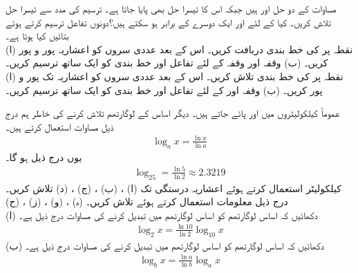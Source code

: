 مساوات  کے دو حل  اور   ہیں جبکہ اس کا تیسرا حل بھی پایا جاتا ہے۔ ترسیم کی مدد سے تیسرا حل تلاش کریں۔
کیا  کے لئے   اور  ایک دوسرے کے برابر ہو سکتے ہیں؟دونوں تفاعل ترسیم کرتے ہوئے بتائیں کیا ہوتا ہے۔
\\
(ا) نقطہ  پر  کی خط بندی دریافت کریں۔ اس کے بعد عددی سروں کو  اعشاریہ  پور و پور کریں۔ (ب) وقفہ  اور وقفہ  کے لئے تفاعل اور خط بندی کو ایک ساتھ ترسیم کریں۔
\\
(ا) نقطہ  پر  کی خط بندی تلاش کریں۔ اس کے بعد عددی سروں کو  اعشاریہ تک پور و پور کریں۔    (ب) وقفہ  اور  کے لئے تفاعل اور خط بندی کو ایک ساتھ ترسیم کریں۔

عموماً کیلکولیٹروں میں  اور  پائے جاتے ہیں۔ دیگر اساس کے لوگارتھم تلاش کرنے کی خاطر ہم درج ذیل مساوات استعمال کرتے ہیں۔
\begin{align*}
\log_ax=\frac{\ln x}{\ln a}
\end{align*}
یوں درج ذیل ہو گا۔
\begin{align*}
\log_25=\frac{\ln 5}{\ln 2}\approx 2.3219
\end{align*}
کیلکولیٹر استعمال کرتے ہوئے   اعشاریہ درستگی تک 
(ا) ، (ب) ، (ج) ، (د)  تلاش کریں۔ درج ذیل معلومات استعمال کرتے ہوئے  تلاش کریں۔
(ہ) ،  (و) ،  (ز) ،  (ح) 
\\
(ا) دکھائیں کہ اساس  لوگارتھم کو اساس  لوگارتھم میں تبدیل کرنے کی مساوات درج ذیل ہے۔
\begin{align*}
\log_2x=\frac{\ln 10}{\ln 2}\log_{10}x
\end{align*}
(ب) دکھائیں کہ اساس   لوگارتھم کو اساس  لوگارتھم میں تبدیل کرنے  کی مساوات درج ذیل ہے۔
\begin{align*}
\log_bx=\frac{\ln a}{\ln b}\log_ax
\end{align*}


